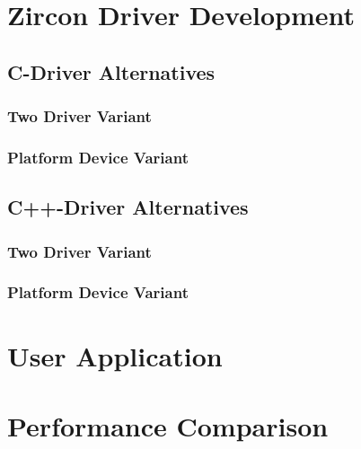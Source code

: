 
\section{Zircon Driver Development}\label{sec:cs-zircon}


\subsection{C-Driver Alternatives}
\subsubsection{Two Driver Variant}
\subsubsection{Platform Device Variant} 

\subsection{C++-Driver Alternatives}
\subsubsection{Two Driver Variant}
\subsubsection{Platform Device Variant}
 


\section{User Application}

\section{Performance Comparison}

